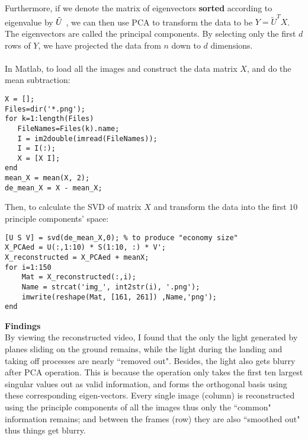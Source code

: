 \begin{questions}
\begin{parts}
\begin{solution}
    Furthermore, if we denote the matrix of eigenvectors \textbf{sorted} according to eigenvalue by $\Tilde{U}$ , we can then use PCA to transform the data to be ${ Y } = \tilde {  U  } ^ { T }  { X }$. The eigenvectors are called the principal components. By selecting only the first $d$ rows of $Y$, we have projected the data from $n$ down to $d$ dimensions. \\\\
    In Matlab, to load all the images and construct the data matrix $X$, and do the mean subtraction:
    \begin{lstlisting}
X = [];
Files=dir('*.png');
for k=1:length(Files)
   FileNames=Files(k).name;
   I = im2double(imread(FileNames));
   I = I(:);
   X = [X I];
end
mean_X = mean(X, 2);
de_mean_X = X - mean_X;
    \end{lstlisting}
    Then, to calculate the SVD of matrix $X$ and transform the data into the first $10$ principle components' space:
    \begin{lstlisting}
[U S V] = svd(de_mean_X,0); % to produce "economy size"
X_PCAed = U(:,1:10) * S(1:10, :) * V';
X_reconstructed = X_PCAed + meanX;
for i=1:150
    Mat = X_reconstructed(:,i);
    Name = strcat('img_', int2str(i), '.png');
    imwrite(reshape(Mat, [161, 261]) ,Name,'png');
end
    \end{lstlisting}
    \textbf{Findings}\\
    By viewing the reconstructed video, I found that the only the light generated by planes sliding on the ground remains, while the light during the landing and taking off processes are nearly ``removed out". Besides, the light also gets blurry after PCA operation. This is because the operation only takes the first ten largest singular values out as valid information, and forms the orthogonal basis using these corresponding eigen-vectors. Every single image (column) is reconstructed using the principle components of all the images thus only the ``common" information remains; and between the frames (row) they are also ``smoothed out" thus things get blurry.
    
\end{solution}
\end{parts}
\end{questions}